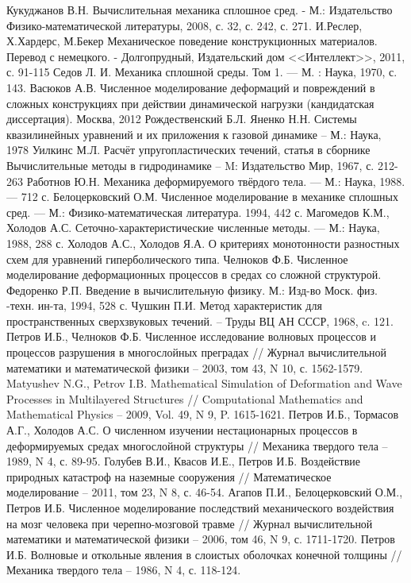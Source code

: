 \begin{thebibliography}{99}
Кукуджанов В.Н. Вычислительная механика сплошное сред. - М.: Издательство 
Физико-математической литературы, 2008, с. 32, с. 242, с. 271.
И.Реслер, Х.Хардерс, М.Бекер Механическое поведение конструкционных материалов. Перевод с немецкого. - Долгопрудный, Издательский дом <<Интеллект>>, 2011, с. 91-115
Седов Л. И. Механика сплошной среды. Том 1. — М. : Наука, 1970, с. 143.
Васюков А.В. Численное моделирование деформаций и повреждений в сложных конструкциях при действии динамической нагрузки (кандидатская диссертация). Москва, 2012
Рождественский Б.Л. Яненко Н.Н. Системы квазилинейных уравнений и их приложения к газовой динамике -- М.: Наука, 1978
Уилкинс М.Л. Расчёт упругопластических течений, статья в сборнике Вычислительные методы в гидродинамике -- M: Издательство Мир, 1967, с. 212-263
Работнов Ю.Н. Механика деформируемого твёрдого тела. — М.: Наука, 1988. — 712 с.
Белоцерковский О.М. Численное моделирование в механике
сплошных сред. — М.: Физико-математическая литература. 1994, 442 с.
Магомедов К.М., Холодов А.С. Сеточно-характеристические
численные методы. — М.: Наука, 1988, 288 с.
Холодов А.С., Холодов Я.А. О критериях монотонности разностных
схем для уравнений гиперболического типа. 
Челноков Ф.Б. Численное моделирование деформационных
процессов в средах со сложной структурой.
Федоренко Р.П. Введение в вычислительную физику. М.:
Изд-во Моск. физ. -техн. ин-та, 1994, 528 с.
Чушкин П.И. Метод характеристик для пространственных сверхзвуковых течений. –  Труды ВЦ АН СССР, 1968, c. 121.
Петров И.Б., Челноков Ф.Б. Численное исследование волновых процессов и процессов разрушения в многослойных преградах // Журнал вычислительной математики и математической физики – 2003, том 43, N 10, с. 1562-1579.
Matyushev N.G., Petrov I.B. Mathematical Simulation of Deformation and Wave Processes in Multilayered Structures // Computational Mathematics and Mathematical Physics – 2009, Vol. 49, N 9, P. 1615-1621.
Петров  И.Б., Тормасов А.Г., Холодов А.С. О численном изучении нестационарных процессов в деформируемых средах многослойной структуры // Механика твердого тела – 1989, N 4, с. 89-95.
Голубев В.И., Квасов И.Е., Петров И.Б. Воздействие природных катастроф на наземные сооружения // Математическое моделирование – 2011, том 23, N 8, с. 46-54.
Агапов П.И., Белоцерковский О.М., Петров И.Б. Численное моделирование последствий механического воздействия на мозг человека при черепно-мозговой травме // Журнал вычислительной математики и математической физики – 2006, том 46, N 9, с. 1711-1720.
Петров И.Б. Волновые и откольные явления в слоистых оболочках конечной толщины // Механика твердого тела – 1986, N 4, с. 118-124.
\end{thebibliography}
